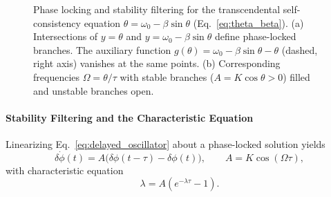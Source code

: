 \documentclass[11pt,a4paper]{article}
\begin{document}
\begin{figure}[ht]

            \caption{\footnotesize
            Phase locking and stability filtering for the transcendental self-consistency equation
                $\theta=\omega_0-\beta\sin\theta$ (Eq.~\ref{eq:theta_beta}).
                (a) Intersections of $y=\theta$ and $y=\omega_0-\beta\sin\theta$ define phase-locked branches.
                The auxiliary function $g(\theta)=\omega_0-\beta\sin\theta-\theta$ (dashed, right axis) vanishes at the same points.
                (b) Corresponding frequencies $\Omega=\theta/\tau$ with stable branches ($A=K\cos\theta>0$) filled and unstable branches open.
            }
            \label{fig:phase_locking}
        \end{figure}

        \paragraph{Stability Filtering and the Characteristic Equation}

            Linearizing Eq.~\ref{eq:delayed_oscillator} about a phase-locked solution yields
            \begin{equation}
                \delta\dot{\phi}(t)
                =
                A\big(\delta\phi(t-\tau)-\delta\phi(t)\big),
                \qquad
                A=K\cos(\Omega\tau),
                \label{eq:linearized_phi}
            \end{equation}
            with characteristic equation
            \begin{equation}
                \lambda = A\left(e^{-\lambda\tau}-1\right).
                \label{eq:characteristic}
            \end{equation}
\end{document}

